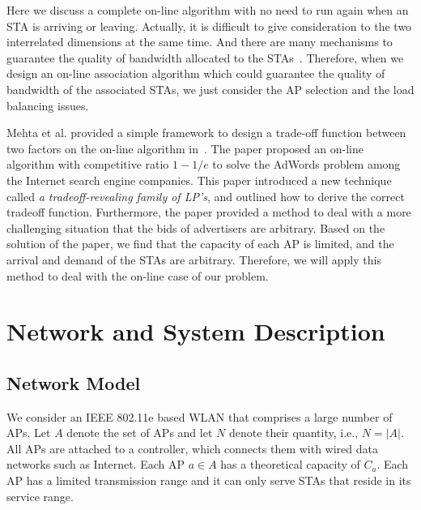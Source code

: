 \documentclass[conference]{IEEEtran}
\begin{document}
  Here we discuss a complete on-line algorithm with no need to run again when an STA is arriving or leaving.  Actually, it is difficult to give consideration to the two interrelated dimensions at the same time.  And there are many mechanisms to guarantee the quality of bandwidth allocated to the STAs~\cite{Ni:2004}.  Therefore, when we design an on-line association algorithm which could guarantee the quality of bandwidth of the associated STAs, we just consider the AP selection and the load balancing issues.

  Mehta et al. provided a simple framework to design a trade-off function between two factors on the on-line algorithm in~\cite{Mehta:2007}.  The paper proposed an on-line algorithm with competitive ratio $1-1/e$ to solve the AdWords problem among the Internet search engine companies.  This paper introduced a new technique called \textit{a tradeoff-revealing family of LP's}, and outlined how to derive the correct tradeoff function.  Furthermore, the paper provided a method to deal with a more challenging situation that the bids of advertisers are arbitrary.  Based on the solution of the paper, we find that the capacity of each AP is limited, and the arrival and demand of the STAs are arbitrary. Therefore, we will apply this method to deal with the on-line case of our problem.


  \section{Network and System Description}\label{sec:network_system}
  \subsection{Network Model}
  We consider an IEEE 802.11e based WLAN that comprises a large number of APs.  Let $A$ denote the set of APs and let $N$ denote their quantity, i.e., $N=|A|$.  All APs are attached to a controller, which connects them with wired data networks such as Internet.  Each AP $a\in A$ has a theoretical capacity of $C_a$.  Each AP has a limited transmission range and it can only serve STAs that reside in its service range.
\end{document}
